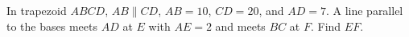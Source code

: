 In trapezoid $ABCD$, $AB\parallel CD$, $AB=10$, $CD=20$, and $AD=7$. A line parallel to the bases meets $AD$ at $E$ with $AE=2$ and meets $BC$ at $F$. Find $EF$.

